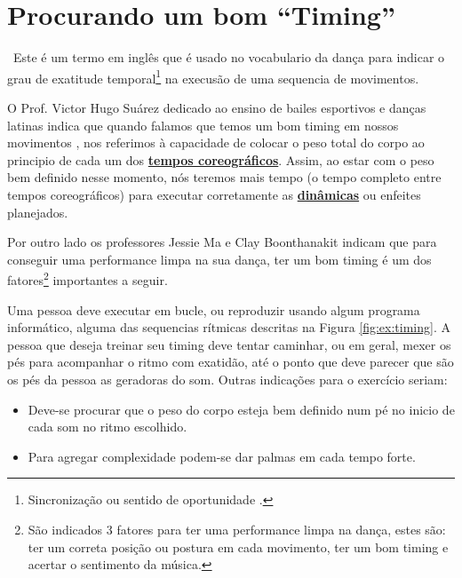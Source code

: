 
\section{Procurando um bom ``Timing''}
\label{sec:dancetimming}

\begin{definition}[Timing]~Este é um termo em inglês que é usado no vocabulario da dança 
para indicar o grau de exatitude temporal\footnote{%
Sincronização ou
sentido de oportunidade \cite{TimingDef}.} 
na execusão de uma sequencia de movimentos.%
\end{definition}

O Prof. Victor Hugo Suárez dedicado ao ensino de bailes esportivos e danças latinas 
indica que quando falamos que temos um bom timing em nossos movimentos \cite{TimingDef2}, 
nos referimos à capacidade de colocar o peso total do corpo ao principio de cada um dos
\hyperref[def:tempocoreografico]{\textbf{tempos coreográficos}}. 
Assim, ao estar com o peso bem definido nesse momento, nós teremos mais tempo 
(o tempo completo entre tempos coreográficos) 
para executar corretamente as \hyperref[sec:musicalidade:dinamicas]{\textbf{dinâmicas}} ou 
enfeites planejados.

Por outro lado os professores Jessie Ma e Clay Boonthanakit
indicam \cite{TimingDef3} que para conseguir uma performance limpa na sua dança,
ter um bom timing é
um dos fatores\footnote{São indicados 3 fatores para ter uma performance limpa na dança,
estes são: ter um correta posição ou postura em cada movimento, ter um bom timing e 
acertar o sentimento da música.} importantes a seguir.

\begin{example}
\label{ex:timing1}
Uma pessoa deve executar em bucle, ou reproduzir usando algum programa informático,
alguma das sequencias rítmicas descritas na Figura \ref{fig:ex:timing}.
A pessoa que deseja treinar seu timing deve tentar caminhar, ou em geral, 
mexer os pés para acompanhar o ritmo com exatidão,
até o ponto que deve parecer que são os pés da pessoa as geradoras do som.
Outras indicações para o exercício seriam:
\begin{itemize}
\item Deve-se procurar que o peso do corpo esteja bem definido num pé
no inicio de cada som no ritmo escolhido.
\item Para agregar complexidade podem-se dar palmas em cada tempo forte.
\end{itemize}
\vspace{-10pt}
\end{example}


